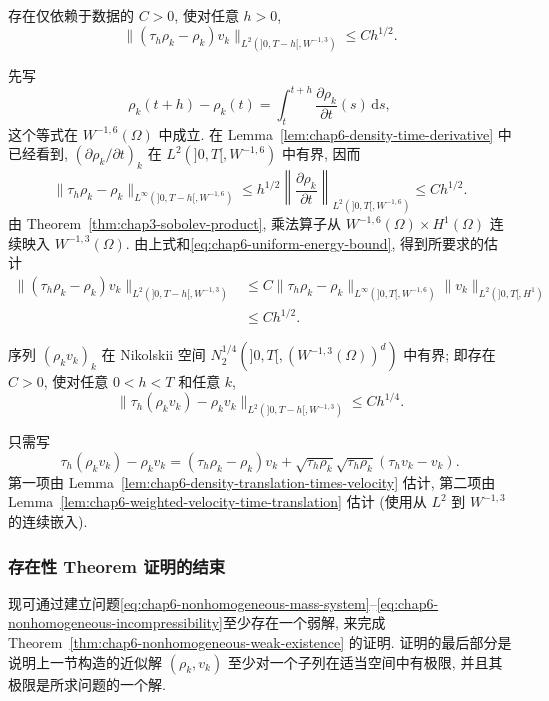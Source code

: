 \begin{sloppypar}
\begin{Lemma}
\label{lem:chap6-density-translation-times-velocity}
存在仅依赖于数据的 $C>0$, 使对任意 $h>0$,
\[
 \|(\tau_h\rho_k-\rho_k)v_k\|_{L^2(]0,T-h[,W^{-1,3})}
 \leq Ch^{1/2}.
\]
\end{Lemma}

\begin{Proof}
先写
\[
 \rho_k(t+h)-\rho_k(t)=\int_t^{t+h}\frac{\partial\rho_k}{\partial t}(s)\,\mathrm ds,
\]
这个等式在 $W^{-1,6}(\Omega)$ 中成立. 在 Lemma~\ref{lem:chap6-density-time-derivative} 中已经看到, $(\partial\rho_k/\partial t)_k$ 在 $L^2(]0,T[,W^{-1,6})$ 中有界, 因而
\[
 \|\tau_h\rho_k-\rho_k\|_{L^\infty(]0,T-h[,W^{-1,6})}
 \leq h^{1/2}
 \left\|\frac{\partial\rho_k}{\partial t}\right\|_{L^2(]0,T[,W^{-1,6})}
 \leq Ch^{1/2}.
\]
由 Theorem~\ref{thm:chap3-sobolev-product}, 乘法算子从 $W^{-1,6}(\Omega)\times H^1(\Omega)$ 连续映入 $W^{-1,3}(\Omega)$. 由上式和\eqref{eq:chap6-uniform-energy-bound}, 得到所要求的估计
\[
\begin{aligned}
 \|(\tau_h\rho_k-\rho_k)v_k\|_{L^2(]0,T-h[,W^{-1,3})}
 &\leq C\|\tau_h\rho_k-\rho_k\|_{L^\infty(]0,T[,W^{-1,6})}
 \|v_k\|_{L^2(]0,T[,H^1)}\\
 &\leq Ch^{1/2}.
\end{aligned}
\]
\end{Proof}

\begin{Proposition}
\label{prop:chap6-momentum-nikolskii-bound}
序列 $(\rho_kv_k)_k$ 在 Nikolskii 空间
$N_2^{1/4}(]0,T[,(W^{-1,3}(\Omega))^d)$ 中有界; 即存在 $C>0$, 使对任意 $0<h<T$ 和任意 $k$,
\[
 \|\tau_h(\rho_kv_k)-\rho_kv_k\|_{L^2(]0,T-h[,W^{-1,3})}
 \leq Ch^{1/4}.
\]
\end{Proposition}

\begin{Proof}
只需写
\[
 \tau_h(\rho_kv_k)-\rho_kv_k
 =(\tau_h\rho_k-\rho_k)v_k
 +\sqrt{\tau_h\rho_k}\sqrt{\tau_h\rho_k}(\tau_hv_k-v_k).
\]
第一项由 Lemma~\ref{lem:chap6-density-translation-times-velocity} 估计, 第二项由 Lemma~\ref{lem:chap6-weighted-velocity-time-translation} 估计 (使用从 $L^2$ 到 $W^{-1,3}$ 的连续嵌入).
\end{Proof}

\subsubsection{存在性 Theorem 证明的结束}
\label{subsec:chap6-existence-proof-conclusion}

现可通过建立问题\eqref{eq:chap6-nonhomogeneous-mass-system}--\eqref{eq:chap6-nonhomogeneous-incompressibility}至少存在一个弱解, 来完成 Theorem~\ref{thm:chap6-nonhomogeneous-weak-existence} 的证明. 证明的最后部分是说明上一节构造的近似解 $(\rho_k,v_k)$ 至少对一个子列在适当空间中有极限, 并且其极限是所求问题的一个解.


\end{sloppypar}
